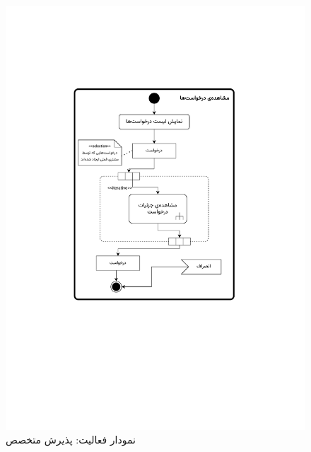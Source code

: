 \begin{figure}
	\centering
	\includegraphics[scale=0.8, page=6]{figs/OOD-activity11-20.pdf}
	\caption{نمودار فعالیت: پذیرش متخصص}
\end{figure}
\FloatBarrier
\newpage

